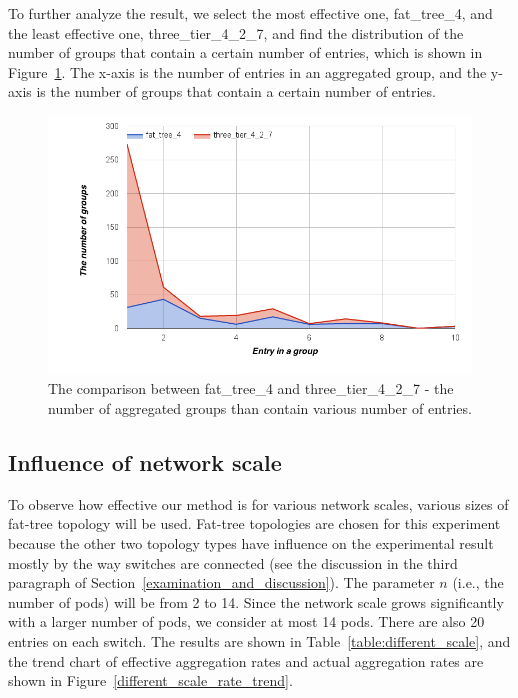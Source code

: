 To further analyze the result, we select the most effective one, fat\_tree\_4, and the least effective one, three\_tier\_4\_2\_7, and find the distribution of the number of groups that contain a certain number of entries, which is shown in Figure~\ref{different_topo_distribute}. The x-axis is the number of entries in an aggregated group, and the y-axis is the number of groups that contain a certain number of entries.

\begin{figure}[H]
\begin{center} 
\includegraphics[width=1\linewidth]{figures/exp_topotype_distribute.png}
\end{center}
\caption{The comparison between fat\_tree\_4 and three\_tier\_4\_2\_7 - the number of aggregated groups than contain various number of entries. }
\label{different_topo_distribute}
\end{figure}

\subsection{Influence of network scale}
To observe how effective our method is for various network scales, various sizes of fat-tree topology will be used. Fat-tree topologies are chosen for this experiment because the other two topology types have influence on the experimental result mostly by the way switches are connected (see the discussion in the third paragraph of Section~\ref{examination_and_discussion}). The parameter $n$ (i.e., the number of pods) will be from 2 to 14. Since the network scale grows significantly with a larger number of pods, we consider at most 14 pods. There are also 20 entries on each switch. The results are shown in Table~\ref{table:different_scale}, and the trend chart of effective aggregation rates and actual aggregation rates are shown in Figure~\ref{different_scale_rate_trend}.

